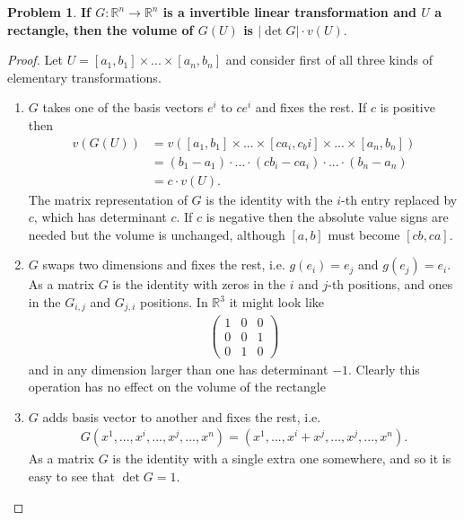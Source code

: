 \documentclass[20pt]{article}
\theoremstyle{plain}
\theoremstyle{definition}
\newtheorem*{problem}{Problem}
\newcommand{\reals}{\mathbb{R}}
\begin{document}
\begin{problem}{3.35}
  \textbf{If $G: \reals^n \to \reals^n$ is a invertible linear transformation and $U$ a 
  rectangle, then the volume of $G(U)$ is $|\det G|\cdot v(U).$}
\end{problem}

\begin{proof}
  Let $U = [a_1, b_1] \times ... \times [a_n, b_n]$
  and consider first of all three kinds of elementary transformations.  
  \begin{enumerate}
     \item $G$ takes one of the basis vectors $e^i$ to $ce^i$ and fixes the rest.
     If $c$ is positive then 
     \begin{align*}
       v(G(U))
       &= v([a_1, b_1]\times...\times[ca_i, c_bi]\times...\times[a_n, b_n]) \\
       &= (b_1 - a_1)\cdot...\cdot(cb_i - ca_i)\cdot ... \cdot(b_n-a_n) \\
       &= c\cdot v(U).
     \end{align*}
     The matrix representation of $G$ is the identity with the $i$-th 
     entry replaced by $c$, which has determinant $c.$ 
     If $c$ is negative then the absolute value signs are needed but 
     the volume is unchanged, although $[a, b]$ must become $[cb, ca]$. 

     \item $G$ swaps two dimensions and fixes the rest, i.e. 
     $g(e_i) = e_j$ and $g(e_j) =e_i.$
     As a matrix $G$ is the identity with zeros in the $i$ and $j$-th positions, 
     and ones in the $G_{i, j}$ and $G_{j,i}$ positions.  In $\reals^3$ it might look like
     \begin{align*}       
       \begin{pmatrix}
         1 & 0 & 0 \\
         0 & 0 & 1 \\
         0 & 1 & 0
       \end{pmatrix}
     \end{align*}
     and in any dimension larger than one has determinant $-1.$  
     Clearly this operation has no effect on the volume of the rectangle 

     \item $G$ adds basis vector to another and fixes the rest, i.e.
     \begin{align*}
       G(x^1,..., x^i,..., x^j,..., x^n) = (x^1,..., x^i + x^j,..., x^j,..., x^n).
     \end{align*}
     As a matrix $G$ is the identity with a single extra one somewhere, and so it is easy to 
     see that $\det G = 1$.



\end{enumerate}
\end{proof}
\end{document}
